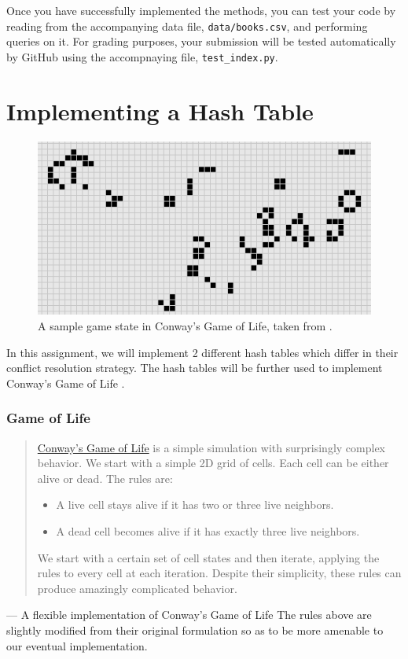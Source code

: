 \documentclass[addpoints]{exam}
\begin{document}
  Once you have successfully implemented the methods, you can test your code by reading from the accompanying data file, \texttt{data/books.csv}, and performing queries on it. For grading purposes, your submission will be tested automatically by GitHub using the accompnaying  file, \texttt{test\_index.py}.

\newpage
\part{Implementing a Hash Table}
  
\begin{figure}[!h]
  \centering
  \includegraphics[scale=.8]{banner}
  \caption{A sample game state in Conway's Game of Life, taken from \cite{chaos}.} %
\end{figure}

In this assignment, we will implement 2 different hash tables which differ in their conflict resolution strategy. The hash tables will be further used to implement Conway's Game of Life \cite{wp_gol}.

\section{Game of Life}
\label{sec:imgops}

\begin{quotation}
\href{https://en.wikipedia.org/wiki/Conway's_Game_of_Life}{Conway’s Game of Life} is a simple simulation with surprisingly complex behavior. We start with a simple 2D grid of cells. Each cell can be either alive or dead. The rules are:
\begin{itemize}
\item A live cell stays alive if it has two or three live neighbors.
\item A dead cell becomes alive if it has exactly three live neighbors.
\end{itemize}
We start with a certain set of cell states and then iterate, applying the rules to every cell at each iteration. Despite their simplicity, these rules can produce amazingly complicated behavior.
\end{quotation}
\raggedleft --- A flexible implementation of Conway's Game of Life \cite{gol_impl}
\justify
The rules above are slightly modified from their original formulation so as to be more amenable to our eventual implementation.
\end{document}
